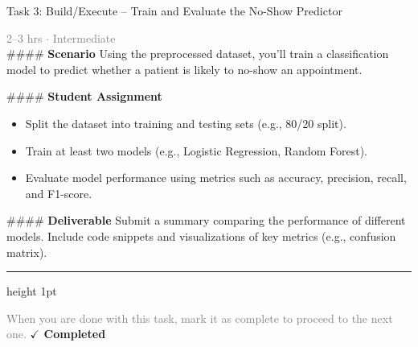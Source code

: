 \documentclass[10pt,a4paper]{article}
\begin{document}
\begin{taskbox}{Task 3: Build/Execute – Train and Evaluate the No-Show Predictor}

    {\small \textcolor{gray}{2--3 hrs $\cdot$ Intermediate}}\\[12pt]

    \#\#\#\# \textbf{Scenario}  
Using the preprocessed dataset, you’ll train a classification model to predict whether a patient is likely to no-show an appointment.  

\#\#\#\# \textbf{Student Assignment}  
\begin{itemize}
    \item Split the dataset into training and testing sets (e.g., 80/20 split).  
    \item Train at least two models (e.g., Logistic Regression, Random Forest).  
    \item Evaluate model performance using metrics such as accuracy, precision, recall, and F1-score.  
\end{itemize}

\#\#\#\# \textbf{Deliverable}  
Submit a summary comparing the performance of different models. Include code snippets and visualizations of key metrics (e.g., confusion matrix).\par

    \vspace{16pt}

    \textcolor{cardBorder}{\hrule height 1pt}\vspace{8pt}

    \small \textcolor{gray}{When you are done with this task, mark it as complete to proceed to the next one.} \hfill \textbf{\textcolor{brandDark}{$\checkmark$ Completed}}

\end{taskbox}
\end{document}
